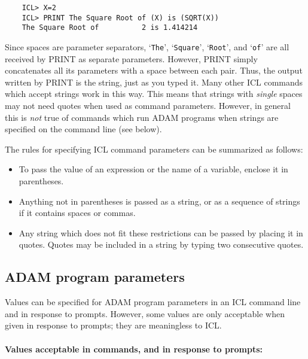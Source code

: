 \begin{small}
\begin{verbatim}
    ICL> X=2
    ICL> PRINT The Square Root of (X) is (SQRT(X))
    The Square Root of          2 is 1.414214    
\end{verbatim}
\end{small}

Since spaces are parameter separators, `\verb+The+', `\verb+Square+',
`\verb+Root+', and `\verb+of+' are all received by PRINT as separate parameters.
However, PRINT simply concatenates all its parameters with a space between each
pair.
Thus, the output written by PRINT is the string, just as you typed it.
Many other ICL commands which accept strings work in this way.
This means that strings with {\em single} spaces may not need quotes when used
as command parameters.
However, in general this is {\em not} true of commands which run ADAM programs
when strings are specified on the command line (see below).

The rules for specifying ICL command parameters can be summarized as follows:
\begin{itemize}
\item To pass the value of an expression or the name of a variable, enclose it
 in parentheses.
\item Anything not in parentheses is passed as a string, or as a sequence of
 strings if it contains spaces or commas.
\item Any string which does not fit these restrictions can be passed by placing
 it in quotes.
 Quotes may be included in a string by typing two consecutive quotes.
\end{itemize}

\subsection{ADAM program parameters}

Values can be specified for ADAM program parameters in an ICL command line and
in response to prompts.
However, some values are only acceptable when given in response to prompts;
they are meaningless to ICL.

\paragraph{Values acceptable in commands, and in response to prompts:}\hfill

